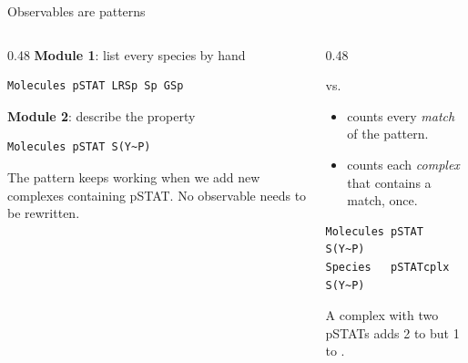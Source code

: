 \documentclass[aspectratio=169,10pt,t]{beamer}
\begin{document}
\begin{frame}[fragile]{Observables are patterns}
  \begin{columns}[T]
    \begin{column}{0.48\textwidth}
      \textbf{Module 1}: list every species by hand
\begin{lstlisting}[language=bngl]
Molecules pSTAT LRSp Sp GSp
\end{lstlisting}
      \vskip2mm
      \textbf{Module 2}: describe the property
\begin{lstlisting}[language=bngl]
Molecules pSTAT S(Y~P)
\end{lstlisting}
      \small
      The pattern keeps working when we add new complexes containing pSTAT.
      No observable needs to be rewritten.
    \end{column}
    \begin{column}{0.48\textwidth}
      \begin{block}{ vs.\ }
        \small
        \begin{itemize}
          \item {} counts every \emph{match} of the pattern.
          \item {} counts each \emph{complex} that contains a match, once.
        \end{itemize}
\begin{lstlisting}[language=bngl]
Molecules pSTAT     S(Y~P)
Species   pSTATcplx S(Y~P)
\end{lstlisting}
        A complex with two pSTATs adds 2 to  but 1 to .
      \end{block}
    \end{column}
  \end{columns}
\end{frame}
\end{document}
